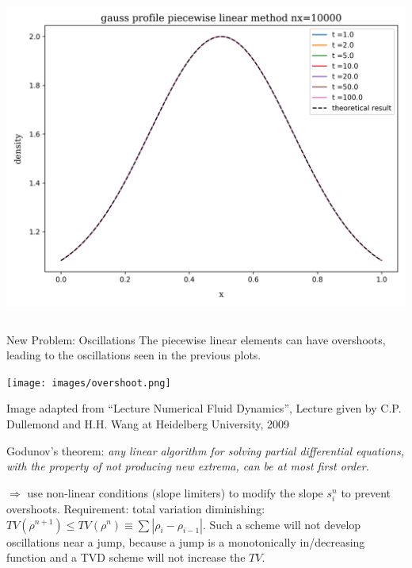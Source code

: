 \begin{frame}
\begin{columns}
			\includegraphics[height=.33\textheight]{../results/1D/pwlin/nx=10000/plot_advection_gauss_pwlin_nx=10000.png}
	\end{columns}
\end{frame}





\begin{frame}
	\begin{block}{New Problem: Oscillations}
		The piecewise linear elements can have overshoots, leading to the oscillations seen in the previous plots.

		
		\begin{center} 
			\texttt{[image: images/overshoot.png]}
			
			\tiny{
				Image adapted from ``Lecture Numerical Fluid Dynamics'', Lecture given by C.P. Dullemond and H.H. Wang at Heidelberg University, 2009
			}
		\end{center}
			
		Godunov's theorem: \textit{any linear algorithm for
			solving partial differential equations, with the property of not producing new extrema, can be at
			most first order.}
		
		$\Rightarrow$ use non-linear conditions (slope limiters) to modify the slope $s_i^n$ to prevent overshoots. Requirement: total variation diminishing: $TV(\rho^{n+1}) \leq TV(\rho^n) \equiv \sum |\rho_i - \rho_{i-1}|$. Such a scheme will not develop oscillations near a jump, because a jump is a monotonically in/decreasing function and a TVD scheme will not increase the $TV$.
	\end{block}
\end{frame}